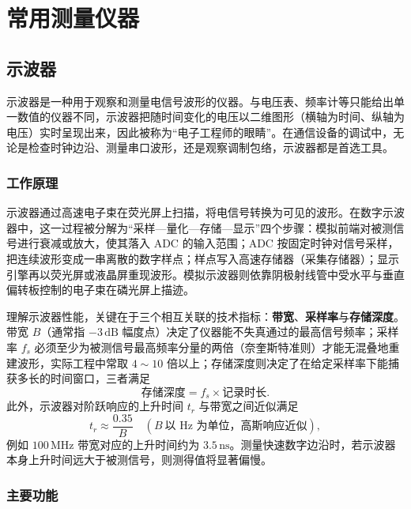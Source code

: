 
\chapter{常用测量仪器}
\label{chap:common_instruments}

\section{示波器}
\label{sec:oscilloscope}

示波器是一种用于观察和测量电信号波形的仪器。与电压表、频率计等只能给出单一数值的仪器不同，示波器把随时间变化的电压以二维图形（横轴为时间、纵轴为电压）实时呈现出来，因此被称为“电子工程师的眼睛”。在通信设备的调试中，无论是检查时钟边沿、测量串口波形，还是观察调制包络，示波器都是首选工具。

\subsection{工作原理}

示波器通过高速电子束在荧光屏上扫描，将电信号转换为可见的波形。在数字示波器中，这一过程被分解为“采样—量化—存储—显示”四个步骤：模拟前端对被测信号进行衰减或放大，使其落入 ADC 的输入范围；ADC 按固定时钟对信号采样，把连续波形变成一串离散的数字样点；样点写入高速存储器（采集存储器）；显示引擎再以荧光屏或液晶屏重现波形。模拟示波器则依靠阴极射线管中受水平与垂直偏转板控制的电子束在磷光屏上描迹。

理解示波器性能，关键在于三个相互关联的技术指标：\textbf{带宽}、\textbf{采样率}与\textbf{存储深度}。带宽 $B$（通常指 $-3\,\mathrm{dB}$ 幅度点）决定了仪器能不失真通过的最高信号频率；采样率 $f_s$ 必须至少为被测信号最高频率分量的两倍（奈奎斯特准则）才能无混叠地重建波形，实际工程中常取 $4\sim10$ 倍以上；存储深度则决定了在给定采样率下能捕获多长的时间窗口，三者满足
\[
    \text{存储深度} = f_s \times \text{记录时长} .
\]
此外，示波器对阶跃响应的上升时间 $t_r$ 与带宽之间近似满足
\[
    t_r \approx \frac{0.35}{B} \quad (B\ \text{以 Hz 为单位，高斯响应近似}) ,
\]
例如 $100\,\mathrm{MHz}$ 带宽对应的上升时间约为 $3.5\,\mathrm{ns}$。测量快速数字边沿时，若示波器本身上升时间远大于被测信号，则测得值将显著偏慢。

\subsection{主要功能}

